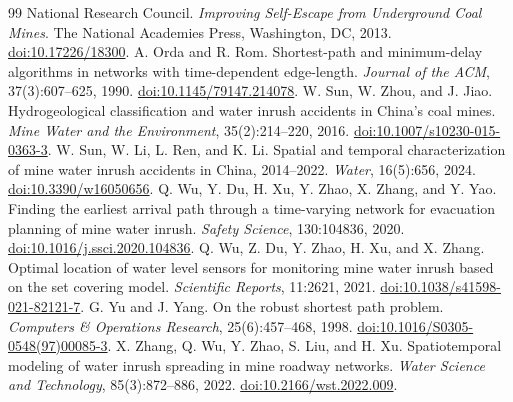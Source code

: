 \documentclass[11pt,a4paper]{article}
\begin{document}
\begin{thebibliography}{99}
 National Research Council. \emph{Improving Self-Escape from Underground Coal Mines}. The National Academies Press, Washington, DC, 2013. \href{https://doi.org/10.17226/18300}{doi:10.17226/18300}.
 A. Orda and R. Rom. Shortest-path and minimum-delay algorithms in networks with time-dependent edge-length. \emph{Journal of the ACM}, 37(3):607--625, 1990. \href{https://doi.org/10.1145/79147.214078}{doi:10.1145/79147.214078}.
 W. Sun, W. Zhou, and J. Jiao. Hydrogeological classification and water inrush accidents in China's coal mines. \emph{Mine Water and the Environment}, 35(2):214--220, 2016. \href{https://doi.org/10.1007/s10230-015-0363-3}{doi:10.1007/s10230-015-0363-3}.
 W. Sun, W. Li, L. Ren, and K. Li. Spatial and temporal characterization of mine water inrush accidents in China, 2014--2022. \emph{Water}, 16(5):656, 2024. \href{https://doi.org/10.3390/w16050656}{doi:10.3390/w16050656}.
 Q. Wu, Y. Du, H. Xu, Y. Zhao, X. Zhang, and Y. Yao. Finding the earliest arrival path through a time-varying network for evacuation planning of mine water inrush. \emph{Safety Science}, 130:104836, 2020. \href{https://doi.org/10.1016/j.ssci.2020.104836}{doi:10.1016/j.ssci.2020.104836}.
 Q. Wu, Z. Du, Y. Zhao, H. Xu, and X. Zhang. Optimal location of water level sensors for monitoring mine water inrush based on the set covering model. \emph{Scientific Reports}, 11:2621, 2021. \href{https://doi.org/10.1038/s41598-021-82121-7}{doi:10.1038/s41598-021-82121-7}.
 G. Yu and J. Yang. On the robust shortest path problem. \emph{Computers \& Operations Research}, 25(6):457--468, 1998. \href{https://doi.org/10.1016/S0305-0548(97)00085-3}{doi:10.1016/S0305-0548(97)00085-3}.
 X. Zhang, Q. Wu, Y. Zhao, S. Liu, and H. Xu. Spatiotemporal modeling of water inrush spreading in mine roadway networks. \emph{Water Science and Technology}, 85(3):872--886, 2022. \href{https://doi.org/10.2166/wst.2022.009}{doi:10.2166/wst.2022.009}.
\end{thebibliography}
\appendix

\end{document}
